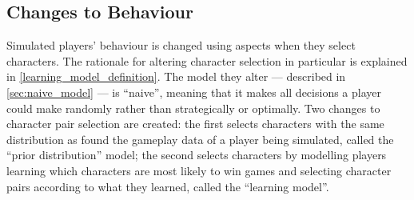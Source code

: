 \subsection{Changes to Behaviour}

Simulated players' behaviour is changed using aspects when they select
characters. The rationale for altering character selection in particular is
explained in \cref{learning_model_definition}. The model they alter ---
described in \cref{sec:naive_model} --- is ``naive'', meaning that it makes all
decisions a player could make randomly rather than strategically or optimally.
Two changes to character pair selection are created: the first selects
characters with the same distribution as found the gameplay data of a player
being simulated, called the ``prior distribution'' model; the second selects
characters by modelling players learning which characters are most likely to win
games and selecting character pairs according to what they learned, called the
``learning model''.

